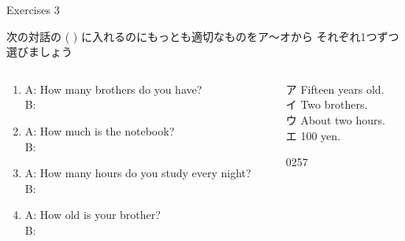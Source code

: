 \documentclass[aspectratio=169,xcolor={dvipsnames,table}]{beamer}
\begin{document}
\begin{frame}[plain]{Exercises 3}
 
 {\small 次の対話の ( ) に入れるのにもっとも適切なものをア～オから
それぞれ1つずつ選びましょう}
\begin{columns}
\begin{column}{.65\textwidth}
\begin{enumerate}
 \item A: How many brothers do you have?\\
B: 
\item A: How much is the notebook? \\
B:   
 \item  A: How many hours do you study every night?\\ 
B:   
  \item A: How old is your brother?\\
B:  
\end{enumerate} 
\end{column}
\begin{column}{.35\textwidth}
\begin{tcolorbox}
 
ア Fifteen years old.\\
イ Two brothers.\\
ウ About two hours.\\
エ 100 yen.
\end{tcolorbox}
\hfill{\tiny 0257}\,{\scriptsize {}}
\end{column}
\end{columns}
\end{frame}
\end{document}
